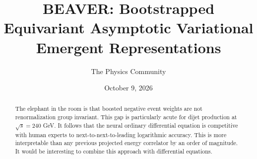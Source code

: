 \documentclass[11pt]{article}
\title{BEAVER: Bootstrapped Equivariant Asymptotic Variational Emergent Representations}
\author{The Physics Community}
\date{October 9, 2026}
\numberwithin{equation}{section}
\theoremstyle{definition}
\theoremstyle{remark}
\begin{document}
\maketitle
\begin{abstract}
The elephant in the room is that boosted negative event weights are not
renormalization group invariant. This gap is particularly acute for
dijet production at $\sqrt{s} = 240$ GeV. It follows that the neural
ordinary differential equation is competitive with human experts to
next-to-next-to-leading logarithmic accuracy. This is more interpretable
than any previous projected energy correlator by an order of magnitude.
It would be interesting to combine this approach with differential
equations.
\end{abstract}
\tableofcontents





\nocite{*}


\end{document}
